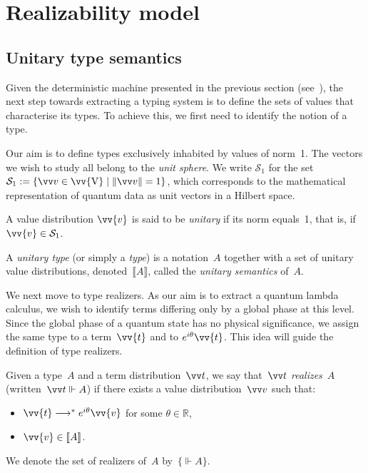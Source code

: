 \documentclass[runningheads,orivec,envcountsame,envcountsect]{llncs}
\newcommand\s[1]{\ensuremath{\mathsf{#1}}}
\newcommand\Val{{\s V}}
\newcommand\lra{\longrightarrow}
\def\R{\mathbb{R}}            %
\def\Val{\mathrm{V}}          %
\def\Sph{\mathcal{S}_1}       %
\def\eval{\lra^*}
\def\sem#1{\llbracket#1\rrbracket}
\def\real{\Vdash}
\begin{document}
\section{Realizability model}\label{sec:model}

\subsection{Unitary type semantics}
Given the deterministic machine presented in the previous section
(see~), the next
step towards extracting a typing system is to define the sets of values that
characterise its types. To achieve this, we first need to identify the notion
of a type.

Our aim is to define types exclusively inhabited by values of norm~1. The
vectors we wish to study all belong to the \emph{unit sphere}. We write $\Sph$
for the set $\Sph := \{\vv v \in \vv{\Val} \mid \|\vv v\| = 1\}$, which
corresponds to the mathematical representation of quantum data as unit vectors
in a Hilbert space.

\begin{definition}
  A value distribution $\vv{v}$ is said to be \emph{unitary} if its norm equals~1,
  that is, if $\vv{v}\in\Sph$.
\end{definition}

\begin{definition}
  A \emph{unitary type} (or simply a \emph{type}) is a notation~$A$ together
  with a set of unitary value distributions, denoted~$\sem{A}$, called the
  \emph{unitary semantics} of~$A$.
\end{definition}


We next move to type realizers. As our aim is to extract a quantum
lambda calculus, we wish to identify terms differing only by a global phase at
this level. Since the global phase of a quantum state has no physical
significance, we assign the same type to a term~$\vv{t}$ and to
$e^{i\theta}\vv{t}$. This idea will guide the definition of type
realizers.

\begin{definition}\label{def:Realizer}
  Given a type~$A$ and a term distribution~$\vv t$, we say that~$\vv t$
  \emph{realizes}~$A$ (written~$\vv t \real A$) if there exists a value
  distribution~$\vv v$ such that:
  \begin{itemize}
    \item $\vv{t}\eval e^{i\theta}\vv{v}$ for some $\theta\in\R$,
    \item $\vv{v}\in\sem{A}$.
  \end{itemize}
  We denote the set of realizers of~$A$ by~$\{\real A\}$.
\end{definition}
\end{document}
